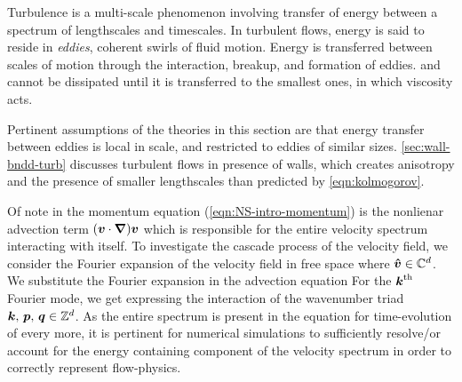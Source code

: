 Turbulence is a multi-scale phenomenon involving transfer of energy between a spectrum of lengthscales and timescales. In turbulent flows, energy is said to reside in \textit{eddies}, coherent swirls of fluid motion. Energy is transferred between scales of motion through the interaction, breakup, and formation of eddies. and  cannot be dissipated until it is transferred to the smallest ones, in which viscosity acts\cite{wall-energy-cascade}.

Pertinent assumptions of the theories in this section are that energy transfer between eddies is local in scale, and restricted to eddies of similar sizes. \autoref{sec:wall-bndd-turb} discusses turbulent flows in presence of walls, which creates anisotropy and the presence of smaller lengthscales than predicted by \autoref{eqn:kolmogorov}.

Of note in the momentum equation (\autoref{eqn:NS-intro-momentum}) is the nonlienar advection term $(\boldsymbol{v}\cdot\boldsymbol{\nabla})\boldsymbol{v}$ which is responsible for the entire velocity spectrum interacting with itself. To investigate the cascade process of the velocity field, we consider the Fourier expansion of the velocity field in free space
where $\boldsymbol{\hat{v}}\in\mathbb{C}^d$. We substitute the Fourier expansion in the advection equation
For the $\boldsymbol{k}^\mathrm{th}$ Fourier mode, we get
expressing the interaction of the wavenumber triad $\boldsymbol{k} ,\,\boldsymbol{p} ,\,\boldsymbol{q}\in\mathbb{Z}^d$. As the entire spectrum is present in the equation for time-evolution of every more, it is pertinent for numerical simulations to sufficiently resolve/or account for the energy containing component of the velocity spectrum in order to correctly represent flow-physics.


